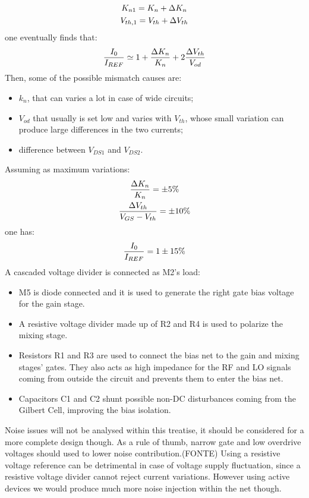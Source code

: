 \begin{gather}
K_{n1}=K_n+\Delta K_n \notag \\
V_{th,1} = V_{th}+\Delta V_{th} \notag
\end{gather}
one eventually finds that:
\begin{equation}
\frac{I_0}{I_{REF}} \simeq 1 + \frac{\Delta K_n}{K_n}+2\frac{\Delta V_{th}}{V_{od}} \notag
\end{equation}
Then, some of the possible mismatch causes are:
\begin{itemize}
	\item $k_n$, that can varies a lot in case of wide circuits;
	\item $V_{od}$ that usually is set low and varies with $V_{th}$, whose small variation can produce large differences in the two currents;
	\item difference between $V_{DS1}$ and $V_{DS2}$.
\end{itemize}
Assuming as maximum variations:
\begin{gather}
\frac{\Delta K_n}{K_n} = \pm 5 \% \notag \\
\frac{\Delta V_{th}}{V_{GS}-V_{th}} = \pm 10 \% \notag
\end{gather}
one has:
\begin{equation}
\frac{I_0}{I_{REF}} = 1 \pm 15 \% \notag
\end{equation}
A cascaded voltage divider is connected as M2's load: 
\begin{itemize}
	\item M5 is diode connected and it is used to generate the right gate bias voltage for the gain stage.
	\item A resistive voltage divider made up of R2 and R4 is used to polarize the mixing stage.
	\item Resistors R1 and R3 are used to connect the bias net to the gain and mixing stages' gates. They also acts as high impedance for the RF and LO signals coming from outside the circuit and prevents them to enter the bias net.
	\item Capacitors C1 and C2 shunt possible non-DC disturbances coming from the Gilbert Cell, improving the bias isolation.
\end{itemize}

Noise issues will not be analysed within this treatise, it should be considered for a more complete design though. As a rule of thumb, narrow gate and low overdrive voltages should used to lower noise contribution.(FONTE) 
Using a resistive voltage reference can be detrimental in case of voltage supply fluctuation, since a resistive voltage divider cannot reject current variations. However using active devices we would produce much more noise injection within the net though.

